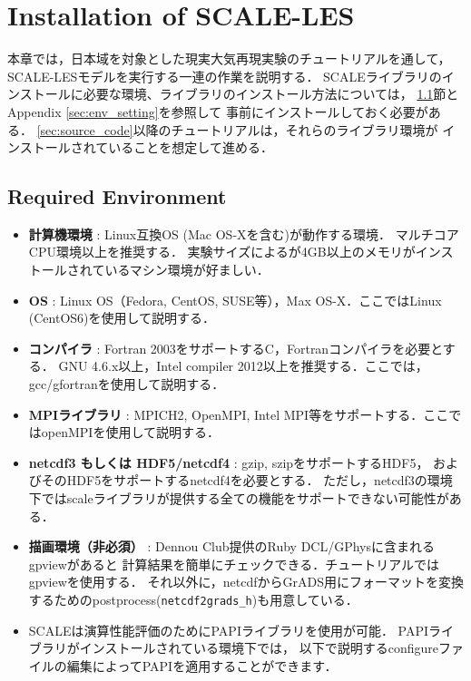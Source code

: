 \section{Installation of SCALE-LES}

本章では，日本域を対象とした現実大気再現実験のチュートリアルを通して，
SCALE-LESモデルを実行する一連の作業を説明する．
SCALEライブラリのインストールに必要な環境、ライブラリのインストール方法については，
\ref{sec:req_env}節とAppendix \ref{sec:env_setting}を参照して
事前にインストールしておく必要がある．
\ref{sec:source_code}以降のチュートリアルは，それらのライブラリ環境が
インストールされていることを想定して進める．


\subsection{Required Environment}
\label{sec:req_env}

\begin{itemize}
  \item {\bf 計算機環境} : Linux互換OS (Mac OS-Xを含む)が動作する環境．
        マルチコアCPU環境以上を推奨する．
        実験サイズによるが4GB以上のメモリがインストールされているマシン環境が好ましい．
  \item {\bf OS} : Linux OS（Fedora, CentOS, SUSE等），Max OS-X．ここではLinux (CentOS6)を使用して説明する．
  \item {\bf コンパイラ} : Fortran 2003をサポートするC，Fortranコンパイラを必要とする．
        GNU 4.6.x以上，Intel compiler 2012以上を推奨する．ここでは，gcc/gfortranを使用して説明する．
  \item {\bf MPIライブラリ} : MPICH2, OpenMPI, Intel MPI等をサポートする．ここではopenMPIを使用して説明する．
  \item {\bf netcdf3 もしくは HDF5/netcdf4} : gzip, szipをサポートするHDF5，
        およびそのHDF5をサポートするnetcdf4を必要とする．
        ただし，netcdf3の環境下ではscaleライブラリが提供する全ての機能をサポートできない可能性がある．
  \item {\bf 描画環境（非必須）} : Dennou Club提供のRuby DCL/GPhysに含まれるgpviewがあると
        計算結果を簡単にチェックできる．チュートリアルではgpviewを使用する．
        それ以外に，netcdfからGrADS用にフォーマットを変換するためのpostprocess(\verb|netcdf2grads_h|)も用意している．
  \item SCALEは演算性能評価のためにPAPIライブラリを使用が可能．
        PAPIライブラリがインストールされている環境下では，
        以下で説明するconfigureファイルの編集によってPAPIを適用することができます．
\end{itemize}


